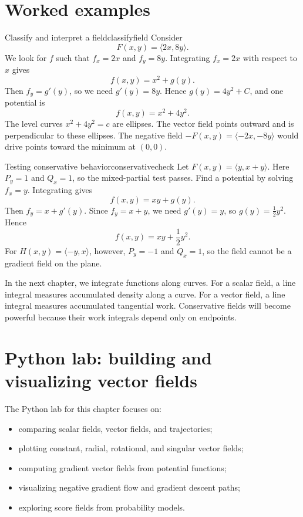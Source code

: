 \documentclass[11pt]{article}
\begin{document}
\section{Worked examples}

\begin{examplebox}{Classify and interpret a field}{classifyfield}
Consider
\[
F(x,y)=\langle 2x,8y\rangle.
\]
We look for $f$ such that $f_x=2x$ and $f_y=8y$. Integrating $f_x=2x$ with respect to $x$ gives
\[
f(x,y)=x^2+g(y).
\]
Then $f_y=g'(y)$, so we need $g'(y)=8y$. Hence $g(y)=4y^2+C$, and one potential is
\[
f(x,y)=x^2+4y^2.
\]
The level curves $x^2+4y^2=c$ are ellipses. The vector field points outward and is perpendicular to these ellipses. The negative field $-F(x,y)=\langle -2x,-8y\rangle$ would drive points toward the minimum at $(0,0)$.
\end{examplebox}

\begin{examplebox}{Testing conservative behavior}{conservativecheck}
Let $F(x,y)=\langle y,x+y\rangle$. Here $P_y=1$ and $Q_x=1$, so the mixed-partial test passes. Find a potential by solving $f_x=y$. Integrating gives
\[
f(x,y)=xy+g(y).
\]
Then $f_y=x+g'(y)$. Since $f_y=x+y$, we need $g'(y)=y$, so $g(y)=\frac12y^2$. Hence
\[
f(x,y)=xy+\frac12y^2.
\]
For $H(x,y)=\langle -y,x\rangle$, however, $P_y=-1$ and $Q_x=1$, so the field cannot be a gradient field on the plane.
\end{examplebox}

\begin{notebox}
In the next chapter, we integrate functions along curves. For a scalar field, a line integral measures accumulated density along a curve. For a vector field, a line integral measures accumulated tangential work. Conservative fields will become powerful because their work integrals depend only on endpoints.
\end{notebox}

\section{Python lab: building and visualizing vector fields}

The Python lab for this chapter focuses on:
\begin{itemize}
  \item comparing scalar fields, vector fields, and trajectories;
  \item plotting constant, radial, rotational, and singular vector fields;
  \item computing gradient vector fields from potential functions;
  \item visualizing negative gradient flow and gradient descent paths;
  \item exploring score fields from probability models.
\end{itemize}
\end{document}
